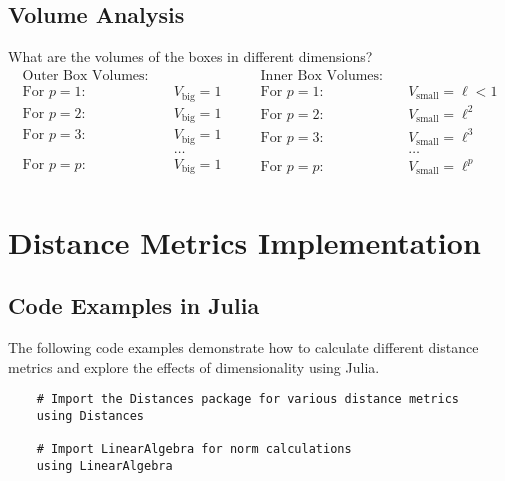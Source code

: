 \documentclass[12pt]{article}
\begin{document}
\subsection{Volume Analysis}
What are the volumes of the boxes in different dimensions?
\[
    \begin{aligned}
        \text{Outer Box Volumes:} \quad\\
        \text{For } p=1: \quad & V_{\text{big}} = 1 \\
        \text{For } p=2: \quad & V_{\text{big}} = 1 \\
        \text{For } p=3: \quad & V_{\text{big}} = 1 \\
        & \dots \\
        \text{For } p=p: \quad & V_{\text{big}} = 1 \\
        \end{aligned}
        \quad \quad
        \begin{aligned}
        \text{Inner Box Volumes:} \quad\\
        \text{For } p=1: \quad & V_{\text{small}} = \ell < 1 \\
        \text{For } p=2: \quad & V_{\text{small}} = \ell^2 \\
        \text{For } p=3: \quad & V_{\text{small}} = \ell^3 \\
        & \dots \\
        \text{For } p=p: \quad & V_{\text{small}} = \ell^p \\
    \end{aligned}
\]

\section{Distance Metrics Implementation}
\subsection{Code Examples in Julia}
The following code examples demonstrate how to calculate different distance metrics and explore the effects of dimensionality using Julia.

\begin{tcolorbox}[width=\textwidth, left=-6mm, sharp corners, boxrule=0pt, title=\textbf{Import required packages}]
  \begin{verbatim}
    # Import the Distances package for various distance metrics
    using Distances
    
    # Import LinearAlgebra for norm calculations
    using LinearAlgebra 
  \end{verbatim}
\end{tcolorbox}
\end{document}
